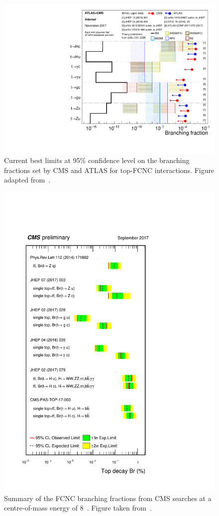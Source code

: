 \begin{figure}[htbp]
	\centering
	\includegraphics[width=1.\linewidth]{1_Introduction/Figures/fcnc_upperlimitsth.pdf}
	\caption{Current best limits at 95\% confidence level on the branching fractions set by CMS and ATLAS for top-FCNC interactions. Figure adapted from~\cite{summarywiki}. }
	\label{fig:fcncupperlimits}
\end{figure}
\begin{figure}[htbp]
	\centering
	\includegraphics[width=0.7\linewidth]{1_Introduction/Figures/summary_FCNC.pdf}
	\caption{Summary of the FCNC branching fractions from CMS searches at a centre-of-mass energy of 8~\TeV. Figure taken from~\cite{summarywiki}.}
	\label{fig:summaryfcnc}
\end{figure}

